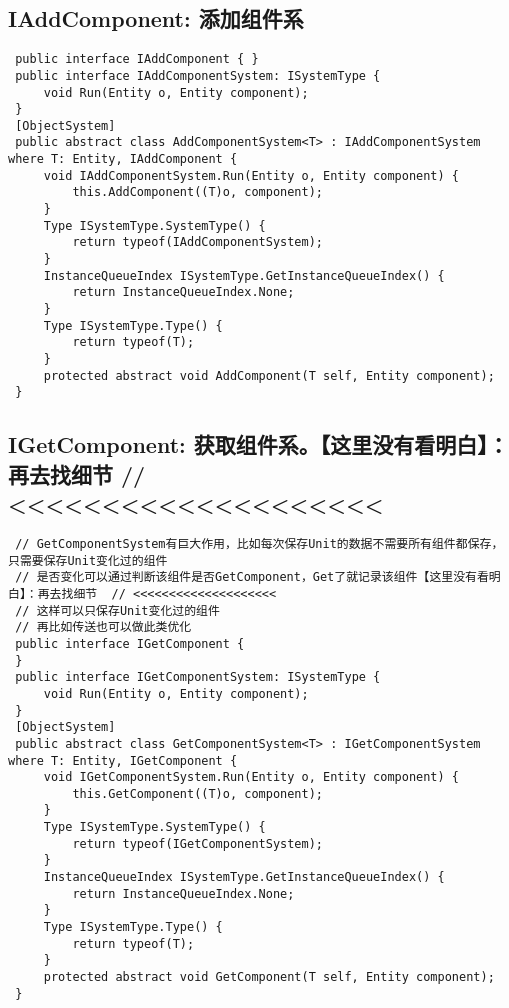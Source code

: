 \documentclass[9pt, b5paper]{article}
\begin{document}
\subsection{IAddComponent: 添加组件系}
\label{sec-1-14}
\begin{verbatim}
 public interface IAddComponent { }
 public interface IAddComponentSystem: ISystemType {
     void Run(Entity o, Entity component);
 }
 [ObjectSystem]
 public abstract class AddComponentSystem<T> : IAddComponentSystem where T: Entity, IAddComponent {
     void IAddComponentSystem.Run(Entity o, Entity component) {
         this.AddComponent((T)o, component);
     }
     Type ISystemType.SystemType() {
         return typeof(IAddComponentSystem);
     }
     InstanceQueueIndex ISystemType.GetInstanceQueueIndex() {
         return InstanceQueueIndex.None;
     }
     Type ISystemType.Type() {
         return typeof(T);
     }
     protected abstract void AddComponent(T self, Entity component);
 }
\end{verbatim}
\subsection{IGetComponent: 获取组件系。【这里没有看明白】：再去找细节  // <<<<<<<<<<<<<<<<<<<<}
\label{sec-1-15}
\begin{verbatim}
 // GetComponentSystem有巨大作用，比如每次保存Unit的数据不需要所有组件都保存，只需要保存Unit变化过的组件
 // 是否变化可以通过判断该组件是否GetComponent，Get了就记录该组件【这里没有看明白】：再去找细节  // <<<<<<<<<<<<<<<<<<<< 
 // 这样可以只保存Unit变化过的组件
 // 再比如传送也可以做此类优化
 public interface IGetComponent {
 }
 public interface IGetComponentSystem: ISystemType {
     void Run(Entity o, Entity component);
 }
 [ObjectSystem]
 public abstract class GetComponentSystem<T> : IGetComponentSystem where T: Entity, IGetComponent {
     void IGetComponentSystem.Run(Entity o, Entity component) {
         this.GetComponent((T)o, component);
     }
     Type ISystemType.SystemType() {
         return typeof(IGetComponentSystem);
     }
     InstanceQueueIndex ISystemType.GetInstanceQueueIndex() {
         return InstanceQueueIndex.None;
     }
     Type ISystemType.Type() {
         return typeof(T);
     }
     protected abstract void GetComponent(T self, Entity component);
 }
\end{verbatim}
\end{document}
